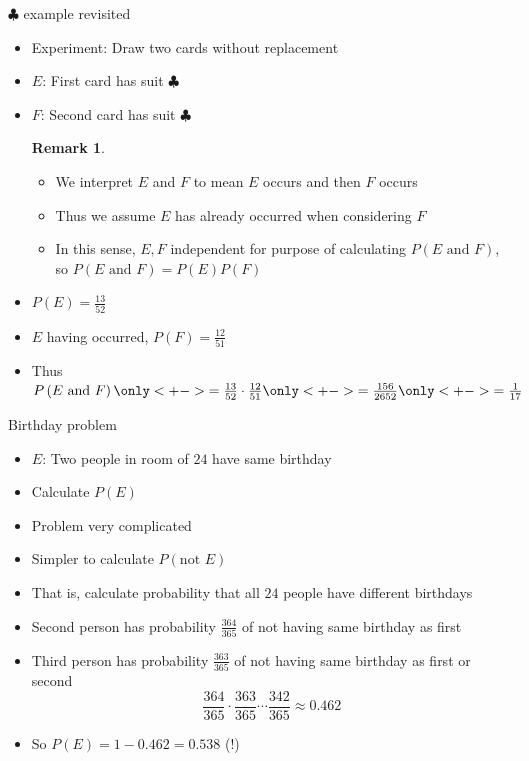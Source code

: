 \documentclass[handout]{beamer}
\theoremstyle{definition}
\newtheorem{remark}{Remark}
\begin{document}
\begin{frame}{$\clubsuit$ example revisited}
\begin{itemize}
\item Experiment: Draw two cards without replacement
\item $E$: First card has suit $\clubsuit$
\item $F$: Second card has suit $\clubsuit$
\begin{remark}
\begin{itemize}
\item We interpret \alert{$E$ and $F$} to mean $E$ occurs
\alert{and then} $F$ occurs
\item Thus we assume $E$ has already occurred when considering $F$
\item In this sense, $E,F$ \alert{independent} for purpose of calculating
$P\left(\text{$E$ and $F$}\right)$, so
$P\left(\text{$E$ and $F$}\right)=P\left(E\right)P\left(F\right)$
\end{itemize}
\end{remark}
\item $P\left(E\right)=\frac{13}{52}$
\item $E$ having occurred, $P\left(F\right)=\frac{12}{51}$
\item Thus $P\left(\text{$E$ and $F$}\right)
\only<+->{=\frac{13}{52}\cdot\frac{12}{51}}
\only<+->{=\frac{156}{2652}}\only<+->{=\frac{1}{17}}$
\end{itemize}
\end{frame}

\begin{frame}{Birthday problem}
\begin{itemize}
\item $E$: Two people in room of $24$ have same birthday
\item Calculate $P\left(E\right)$
\item Problem very complicated
\item Simpler to calculate $P\left(\text{not $E$}\right)$
\item That is, calculate probability that all $24$ people
have different birthdays
\item Second person has probability $\frac{364}{365}$ of
not having same birthday as first
\item Third person has probability $\frac{363}{365}$ of
not having same birthday as first or second
\[\frac{364}{365}
\cdot\frac{363}{365}
\cdots\frac{342}{365}\approx 0.462\]
\item So $P\left(E\right)=1-0.462=0.538$ (\alert{!})
\end{itemize}
\end{frame}
\end{document}
